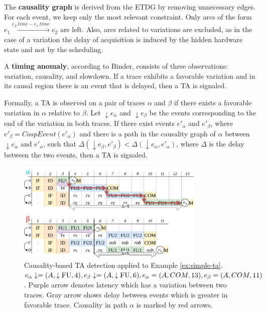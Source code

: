 The \textbf{causality graph} is derived from the ETDG by removing unnecessary edges. For each event, we keep only the most relevant constraint. Only arcs of the form $e_1 \xrightarrow{e_2.time - e_1.time} e_2$ are left. Also, arcs related to variations are excluded, as in the case of a variation the delay of acquisition is induced by the hidden hardware state and not by the scheduling.

A \textbf{timing anomaly}, according to Binder, consists of three observations: variation, causality, and slowdown. If a trace exhibits a favorable variation and in its causal region there is an event that is delayed, then a TA is signaled.

Formally, a TA is observed on a pair of traces $\alpha$ and $\beta$ if there exists a favorable variation in $\alpha$ relative to $\beta$. Let $\downarrow e_\alpha$ and $\downarrow e_\beta$ be the events corresponding to the end of the variation in both traces. If there exist events $e'_\alpha$ and $e'_\beta$, where $e'_\beta = CospEvent(e'_\alpha)$ and there is a path in the causality graph of $\alpha$ between $\downarrow e_\alpha$ and $e'_\alpha$, such that $\Delta(\downarrow e_\beta,e'_\beta) < \Delta(\downarrow e_\alpha,e'_\alpha)$, where $\Delta$ is the delay between the two events, then a TA is signaled.

\begin{figure}[htbp]
    \centering
    \includegraphics[width=0.8\textwidth]{figures/multiscalar_ta_causality.png}
    \caption{Causality-based TA detection applied to Example \ref{ex:simple-ta}. $e_\alpha\downarrow = (A, \downarrow\mathrm{FU}, 4), e_\beta\downarrow = (A, \downarrow\mathrm{FU}, 6), e_\alpha = (A, COM, 13), e_\beta = (A, COM, 11)$. Purple arrow denotes latency which has a variation between two traces. Gray arrow shows delay between events which is greater in favorable trace. Causality in  path $\alpha$ is marked by red arrows. }
    \label{fig:multiscalar-ta-causality}
\end{figure}

